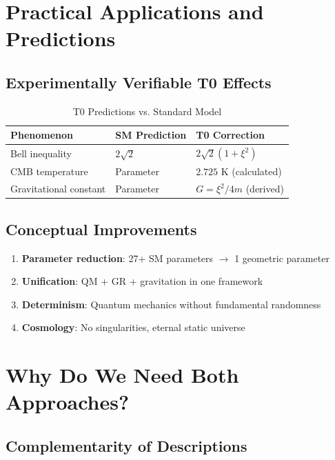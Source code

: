 	\section{Practical Applications and Predictions}
	
	\subsection{Experimentally Verifiable T0 Effects}
	
	\begin{table}[h]
		\centering
		\begin{tabular}{|l|l|l|}
			\hline
			\textbf{Phenomenon} & \textbf{SM Prediction} & \textbf{T0 Correction} \\
			\hline
			Bell inequality & $2\sqrt{2}$ & $2\sqrt{2}(1 + \xi^2)$ \\
			CMB temperature & Parameter & $2.725$ K (calculated) \\
			Gravitational constant & Parameter & $G = \xi^2/4m$ (derived) \\
			\hline
		\end{tabular}
		\caption{T0 Predictions vs. Standard Model}
	\end{table}
	
	\subsection{Conceptual Improvements}
	
	\begin{enumerate}
		\item \textbf{Parameter reduction}: 27+ SM parameters $\to$ 1 geometric parameter
		\item \textbf{Unification}: QM + GR + gravitation in one framework
		\item \textbf{Determinism}: Quantum mechanics without fundamental randomness
		\item \textbf{Cosmology}: No singularities, eternal static universe
	\end{enumerate}
	
	\section{Why Do We Need Both Approaches?}
	
	\subsection{Complementarity of Descriptions}
	

